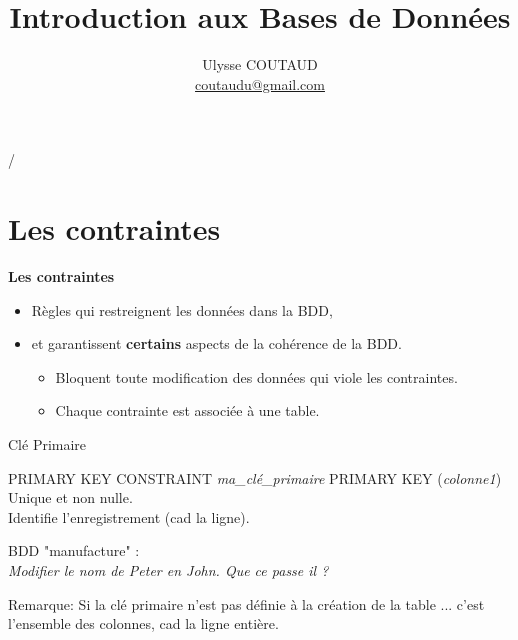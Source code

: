 \documentclass[dvipsnames]{beamer}
\begin{document}
\title{Introduction aux Bases de Données}

 {   \hspace{1em} \insertframenumber/\inserttotalframenumber }

\author{Ulysse COUTAUD\\\href{mailto:coutaudu@gmail.com}{\small coutaudu@gmail.com}}
\date{}
	
\maketitle

\section{Les contraintes}
\begin{frame}
\begin{center}
{\LARGE \textbf{Les contraintes}}
\end{center}
\pause
\begin{itemize}
	\item Règles qui restreignent les données dans la BDD,
	\item et garantissent \textbf{certains} aspects de la cohérence de la BDD.
	\begin{itemize}
		\item Bloquent toute modification des données qui viole les contraintes.
		\item Chaque contrainte est associée à une table.
	\end{itemize}
\end{itemize}
\end{frame}

\begin{frame}{Clé Primaire}
	\begin{alertblock}{PRIMARY KEY}
		CONSTRAINT \textit{ma\_clé\_primaire} PRIMARY KEY (\textit{colonne1})\\
		Unique et non nulle.\\
		Identifie l'enregistrement (cad la ligne).\\
	\end{alertblock}
	
\begin{scriptsize}
	BDD "manufacture" :\\
	\textit{Modifier le nom de Peter en John. Que ce passe il ? }\\
\end{scriptsize}

	\vspace*{1em}
	Remarque: Si la clé primaire n'est pas définie à la création de la table ... \pause c'est l'ensemble des colonnes, cad la ligne entière.
	
	
\end{frame}
\end{document}
